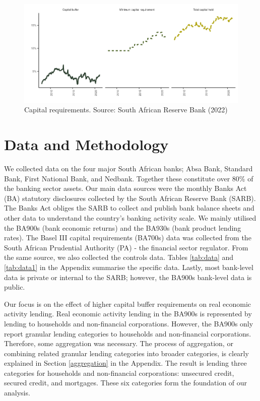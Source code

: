 \documentclass[
]{article}
\begin{document}
\begin{figure}[H]

\includegraphics{Bank_capital_and_bank_lending_files/figure-latex/capital-1} \hfill{}

\caption{Capital requirements. Source: South African Reserve Bank (2022)}\label{fig:capital}
\end{figure}

\hypertarget{data}{%
\section{Data and Methodology}\label{data}}

We collected data on the four major South African banks; Absa Bank, Standard Bank, First National Bank, and Nedbank. Together these constitute over 80\% of the banking sector assets. Our main data sources were the monthly Banks Act (BA) statutory disclosures collected by the South African Reserve Bank (SARB). The Banks Act obliges the SARB to collect and publish bank balance sheets and other data to understand the country's banking activity scale. We mainly utilised the BA900s (bank economic returns) and the BA930s (bank product lending rates). The Basel III capital requirements (BA700s) data was collected from the South African Prudential Authority (PA) - the financial sector regulator. From the same source, we also collected the controls data. Tables \ref{tab:data} and \ref{tab:data1} in the Appendix summarise the specific data. Lastly, most bank-level data is private or internal to the SARB; however, the BA900s bank-level data is public.

Our focus is on the effect of higher capital buffer requirements on real economic activity lending. Real economic activity lending in the BA900s is represented by lending to households and non-financial corporations. However, the BA900s only report granular lending categories to households and non-financial corporations. Therefore, some aggregation was necessary. The process of aggregation, or combining related granular lending categories into broader categories, is clearly explained in Section \ref{aggregation} in the Appendix. The result is lending three categories for households and non-financial corporations: unsecured credit, secured credit, and mortgages. These six categories form the foundation of our analysis.
\end{document}
